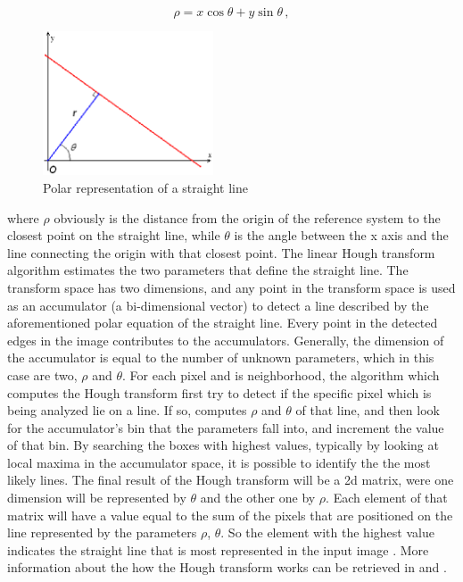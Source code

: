 \begin{equation*}
  \rho = x \cos{\theta} + y \sin{\theta} \,,
\end{equation*}

\begin{figure}[htbp]
  \centering
  \includegraphics[width=0.45\textwidth]{gfx/R_theta_line.eps}
  \caption{Polar representation of a straight line \cite{pichough}}
  \label{fig:linePolar}
\end{figure}

where $\rho$ obviously is the distance from the origin of the reference system to the closest point on the straight line, while $\theta$ is the angle between the x axis and the line connecting the origin with that closest point.
The linear Hough transform algorithm estimates the two parameters that define the straight line. The transform space has two dimensions, and any point in the transform space is used as an accumulator (a bi-dimensional vector) to detect a line described by the aforementioned polar equation of the straight line. Every point in the detected edges in the image contributes to the accumulators. Generally, the dimension of the accumulator is equal to the number of unknown parameters, which in this case are two, $\rho$ and $\theta$. For each pixel and is neighborhood, the algorithm which computes the Hough transform first try to detect if the specific pixel which is being analyzed lie on a line. If so, computes $\rho$ and $\theta$ of that line, and then look for the accumulator's bin that the parameters fall into, and increment the value of that bin.
By searching the boxes with highest values, typically by looking at local maxima in the accumulator space, it is possible to identify the the most likely lines. The final result of the Hough transform will be a \acrshort{2d} matrix, were one dimension will be represented by $\theta$ and the other one by $\rho$.
Each element of that matrix will have a value equal to the sum of the pixels that are positioned on the line represented by the parameters $\rho$, $\theta$. So the element with the highest value indicates the straight line that is most represented in the input image \cite{houghreport}. More information about the how the Hough transform works can be retrieved in \cite{10.1145/361237.361242} and \cite{osti_4746348}.

